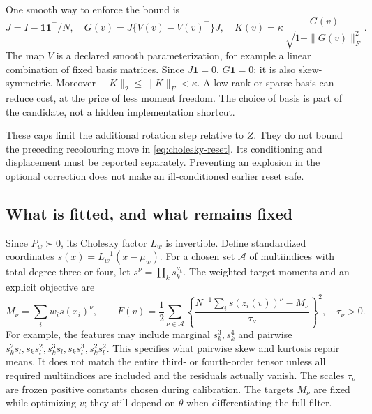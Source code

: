 \documentclass[11pt,a4paper]{article}
\newcommand{\one}{\mathbf 1}
\begin{document}
One smooth way to enforce the bound is
\begin{equation}
\label{eq:bounded-skew}
 J=I-\one\one^\top/N,\quad
 G(v)=J\{V(v)-V(v)^\top\}J,\quad
 K(v)=\kappa\,\frac{G(v)}{\sqrt{1+\|G(v)\|_F^2}} .
\end{equation}
The map \(V\) is a declared smooth parameterization, for example a linear
combination of fixed basis matrices. Since \(J\one=0\), \(G\one=0\);
it is also skew-symmetric. Moreover
\(\|K\|_2\leq\|K\|_F<\kappa\).
A low-rank or sparse basis can reduce cost, at the price of less moment
freedom. The choice of basis is part of the candidate, not a hidden
implementation shortcut.

These caps limit the additional rotation step relative to \(Z\).
They do not bound the preceding recolouring move in
\eqref{eq:cholesky-reset}. Its conditioning and displacement must be
reported separately. Preventing an explosion in the optional correction
does not make an ill-conditioned earlier reset safe.

\subsection{What is fitted, and what remains fixed}

Since \(P_w\succ0\), its Cholesky factor \(L_w\) is invertible.
Define standardized coordinates \(s(x)=L_w^{-1}(x-\mu_w)\).
For a chosen set \(\mathcal A\) of multiindices with total degree three
or four, let \(s^\nu=\prod_k s_k^{\nu_k}\). The weighted target moments
and an explicit objective are
\begin{equation}
\label{eq:moment-objective}
 M_\nu=\sum_iw_i s(x_i)^\nu,\qquad
 F(v)=\frac12\sum_{\nu\in\mathcal A}
 \left\{\frac{N^{-1}\sum_i s(z_i(v))^\nu-M_\nu}{\tau_\nu}\right\}^{\!2},
 \quad \tau_\nu>0 .
\end{equation}
For example, the features may include marginal \(s_k^3,s_k^4\) and
pairwise \(s_k^2s_l,s_ks_l^2,s_k^3s_l,s_ks_l^3,s_k^2s_l^2\).
This specifies what pairwise skew and kurtosis repair means. It does not
match the entire third- or fourth-order tensor unless all required
multiindices are included and the residuals actually vanish.
The scales \(\tau_\nu\) are frozen positive constants chosen during
calibration. The targets \(M_\nu\) are fixed while optimizing \(v\);
they still depend on \(\theta\) when differentiating the full filter.
\end{document}

